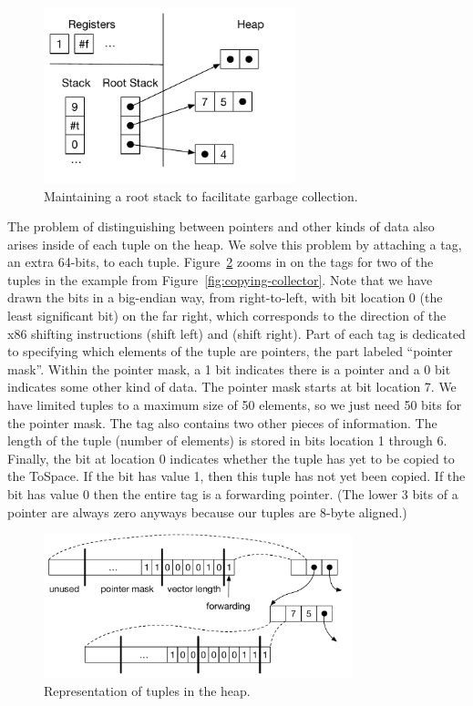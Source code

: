 \documentclass[11pt]{book}
\begin{document}
\begin{figure}[tbp]
\centering \includegraphics[width=0.65\textwidth]{figs/root-stack}
\caption{Maintaining a root stack to facilitate garbage collection.}
\label{fig:shadow-stack}
\end{figure}

The problem of distinguishing between pointers and other kinds of data
also arises inside of each tuple on the heap. We solve this problem by
attaching a tag, an extra 64-bits, to each
tuple. Figure~\ref{fig:tuple-rep} zooms in on the tags for two of the
tuples in the example from Figure~\ref{fig:copying-collector}. Note
that we have drawn the bits in a big-endian way, from right-to-left,
with bit location 0 (the least significant bit) on the far right,
which corresponds to the direction of the x86 shifting instructions
 (shift left) and  (shift right). Part of each tag
is dedicated to specifying which elements of the tuple are pointers,
the part labeled ``pointer mask''. Within the pointer mask, a 1 bit
indicates there is a pointer and a 0 bit indicates some other kind of
data. The pointer mask starts at bit location 7. We have limited
tuples to a maximum size of 50 elements, so we just need 50 bits for
the pointer mask. The tag also contains two other pieces of
information. The length of the tuple (number of elements) is stored in
bits location 1 through 6. Finally, the bit at location 0 indicates
whether the tuple has yet to be copied to the ToSpace.  If the bit has
value 1, then this tuple has not yet been copied.  If the bit has
value 0 then the entire tag is a forwarding pointer. (The lower 3 bits
of a pointer are always zero anyways because our tuples are 8-byte
aligned.)

\begin{figure}[tbp]
\centering \includegraphics[width=0.8\textwidth]{figs/tuple-rep}
\caption{Representation of tuples in the heap.}
\label{fig:tuple-rep}
\end{figure}
\end{document}
